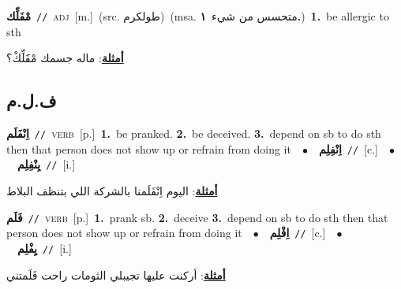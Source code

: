 \documentclass[10pt,a4paper,twoside]{article} %
\begin{document}
\begin{multicols}{2}
{\setlength\topsep{0pt}\textbf{\foreignlanguage{arabic}{مْفَلِّك}}\ {\color{gray}\texttt{//}\color{black}}\ \textsc{adj}\ [m.]\ (src. \color{gray}\foreignlanguage{arabic}{طولكرم}\color{black})\ \color{gray}(msa. \foreignlanguage{arabic}{متحسس من شيء}~\foreignlanguage{arabic}{\textbf{١.}})\color{black}\ \textbf{1.}~be allergic to sth\  \begin{flushright}\color{gray}\foreignlanguage{arabic}{\textbf{\underline{\foreignlanguage{arabic}{أمثلة}}}: ماله جسمك مْفََلِّكْ؟}\end{flushright}\color{black}} \vspace{2mm}

\vspace{-3mm}
\subsection*{\color{blue}\foreignlanguage{arabic}{ف.ل.م}\color{blue}{}} 

{\setlength\topsep{0pt}\textbf{\foreignlanguage{arabic}{اِنْفَلَم}}\ {\color{gray}\texttt{//}\color{black}}\ \textsc{verb}\ [p.]\ \textbf{1.}~be pranked.  \textbf{2.}~be deceived.  \textbf{3.}~depend on sb to do sth then that person does not show up or refrain from doing it\ \ $\bullet$\ \ \setlength\topsep{0pt}\textbf{\foreignlanguage{arabic}{اِنْفِلِم}}\ {\color{gray}\texttt{//}\color{black}}\ [c.]\ \ $\bullet$\ \ \setlength\topsep{0pt}\textbf{\foreignlanguage{arabic}{يِنْفِلِم}}\ {\color{gray}\texttt{//}\color{black}}\ [i.]\  \begin{flushright}\color{gray}\foreignlanguage{arabic}{\textbf{\underline{\foreignlanguage{arabic}{أمثلة}}}: اليوم اِنْفَلَمنا بالشركة اللي بتنظف البلاط}\end{flushright}\color{black}} \vspace{2mm}

{\setlength\topsep{0pt}\textbf{\foreignlanguage{arabic}{فَلَم}}\ {\color{gray}\texttt{//}\color{black}}\ \textsc{verb}\ [p.]\ \textbf{1.}~prank sb.  \textbf{2.}~deceive  \textbf{3.}~depend on sb to do sth then that person does not show up or refrain from doing it\ \ $\bullet$\ \ \setlength\topsep{0pt}\textbf{\foreignlanguage{arabic}{اِفْلِم}}\ {\color{gray}\texttt{//}\color{black}}\ [c.]\ \ $\bullet$\ \ \setlength\topsep{0pt}\textbf{\foreignlanguage{arabic}{يِفْلِم}}\ {\color{gray}\texttt{//}\color{black}}\ [i.]\  \begin{flushright}\color{gray}\foreignlanguage{arabic}{\textbf{\underline{\foreignlanguage{arabic}{أمثلة}}}: أركنت عليها تجيبلي الثومات راحت فَلَمتني}\end{flushright}\color{black}} \vspace{2mm}


\end{multicols}
\end{document}
